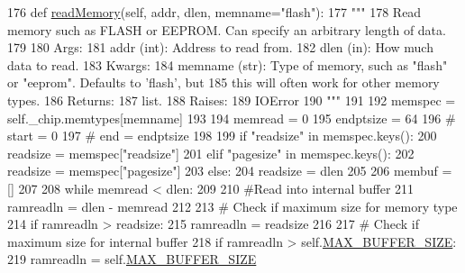 \begin{DoxyCode}
176     \textcolor{keyword}{def }\hyperlink{classsoftware_1_1chipwhisperer_1_1hardware_1_1naeusb_1_1programmer__xmega_1_1XMEGAPDI_a9aff0e9c766ac9b74e3e1ec6074c79e3}{readMemory}(self, addr, dlen, memname="flash"):
177         \textcolor{stringliteral}{"""}
178 \textcolor{stringliteral}{        Read memory such as FLASH or EEPROM. Can specify an arbitrary length of data.}
179 \textcolor{stringliteral}{}
180 \textcolor{stringliteral}{        Args:}
181 \textcolor{stringliteral}{            addr (int): Address to read from.}
182 \textcolor{stringliteral}{            dlen (in): How much data to read.}
183 \textcolor{stringliteral}{        Kwargs:}
184 \textcolor{stringliteral}{            memname (str): Type of memory, such as "flash" or "eeprom". Defaults to 'flash', but}
185 \textcolor{stringliteral}{                           this will often work for other memory types.}
186 \textcolor{stringliteral}{        Returns:}
187 \textcolor{stringliteral}{            list.}
188 \textcolor{stringliteral}{        Raises:}
189 \textcolor{stringliteral}{            IOError}
190 \textcolor{stringliteral}{        """}
191 
192         memspec = self.\_chip.memtypes[memname]
193 
194         memread = 0
195         endptsize = 64
196         \textcolor{comment}{# start = 0}
197         \textcolor{comment}{# end = endptsize}
198 
199         \textcolor{keywordflow}{if} \textcolor{stringliteral}{"readsize"} \textcolor{keywordflow}{in} memspec.keys():
200             readsize = memspec[\textcolor{stringliteral}{"readsize"}]
201         \textcolor{keywordflow}{elif} \textcolor{stringliteral}{"pagesize"} \textcolor{keywordflow}{in} memspec.keys():
202             readsize = memspec[\textcolor{stringliteral}{"pagesize"}]
203         \textcolor{keywordflow}{else}:
204             readsize = dlen
205 
206         membuf = []
207 
208         \textcolor{keywordflow}{while} memread < dlen:
209 
210             \textcolor{comment}{#Read into internal buffer}
211             ramreadln = dlen - memread
212 
213             \textcolor{comment}{# Check if maximum size for memory type}
214             \textcolor{keywordflow}{if} ramreadln > readsize:
215                 ramreadln = readsize
216 
217             \textcolor{comment}{# Check if maximum size for internal buffer}
218             \textcolor{keywordflow}{if} ramreadln > self.\hyperlink{classsoftware_1_1chipwhisperer_1_1hardware_1_1naeusb_1_1programmer__xmega_1_1XMEGAPDI_a947def82a41a9bf20a295b997f03b9d8}{MAX\_BUFFER\_SIZE}:
219                 ramreadln = self.\hyperlink{classsoftware_1_1chipwhisperer_1_1hardware_1_1naeusb_1_1programmer__xmega_1_1XMEGAPDI_a947def82a41a9bf20a295b997f03b9d8}{MAX\_BUFFER\_SIZE}

\end{DoxyCode}
